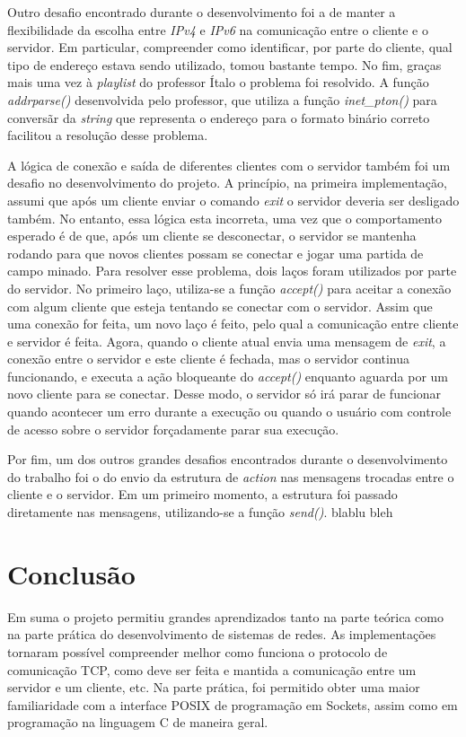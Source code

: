 \documentclass{article}
\begin{document}
Outro desafio encontrado durante o desenvolvimento foi a de manter a
flexibilidade da escolha entre \textit{IPv4} e \textit{IPv6} na comunicação
entre o cliente e o servidor. Em particular, compreender como identificar, por
parte do cliente, qual tipo de endereço estava sendo utilizado, tomou bastante
tempo. No fim,
graças mais uma vez à \textit{playlist} do professor Ítalo o problema foi
resolvido. A função \textit{addrparse()} desenvolvida pelo professor, que
utiliza a função \textit{inet\_pton()} para conversãr da \textit{string} que
representa o endereço para o formato binário correto
facilitou a resolução desse problema.

A lógica de conexão e saída de diferentes clientes com o servidor também foi um
desafio no desenvolvimento do projeto. A princípio,
na primeira implementação, assumi que após um cliente enviar o comando
\textit{exit} o servidor deveria ser desligado também. No entanto, essa lógica
esta
incorreta, uma vez que o comportamento esperado é de que, após um cliente se
desconectar, o servidor se mantenha rodando para que novos clientes possam se
conectar e jogar uma partida de
campo minado. Para resolver esse problema, dois laços foram utilizados por
parte do servidor. No primeiro laço, utiliza-se a função \textit{accept()} para
aceitar a conexão com
algum cliente que esteja tentando se conectar com o servidor. Assim que uma
conexão for feita, um novo laço é feito, pelo qual a comunicação entre cliente
e servidor é feita. Agora, quando
o cliente atual envia uma mensagem de \textit{exit}, a conexão entre o servidor
e este cliente é fechada, mas o servidor continua funcionando, e executa a ação
bloqueante do \textit{accept()} enquanto aguarda por um novo cliente para
se conectar. Desse modo, o servidor só irá parar de funcionar quando acontecer
um erro durante a execução ou quando o usuário com controle de acesso sobre o
servidor forçadamente parar sua execução.

Por fim, um dos outros grandes desafios encontrados durante o desenvolvimento
do trabalho foi o do envio da estrutura de \textit{action} nas mensagens
trocadas entre
o cliente e o servidor. Em um primeiro momento, a estrutura foi passado
diretamente nas mensagens, utilizando-se a função \textit{send()}. blablu bleh

\section{Conclusão}

Em suma o projeto permitiu grandes aprendizados tanto na parte teórica como na
parte prática do desenvolvimento de sistemas de redes. As implementações
tornaram
possível compreender melhor como funciona o protocolo de comunicação TCP, como
deve ser feita e mantida a comunicação entre um servidor e um cliente, etc. Na
parte prática, foi permitido obter uma maior familiaridade
com a interface POSIX de programação em Sockets, assim como em programação na
linguagem C de maneira geral.
\end{document}
